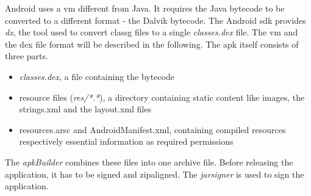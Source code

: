 Android uses a \gls{vm} different from Java.
It requires the Java bytecode to be converted to a different format - the Dalvik bytecode.
The Android \gls{sdk} provides \textit{dx}, the tool used to convert \gls{classg} files to a single \textit{classes.dex} file.
The \gls{vm} and the \gls{dex} file format will be described in the following.
\newline
The \gls{apk} itself consists of three parts.
\begin{itemize}
\item \textit{classes.dex}, a file containing the bytecode
\item resource files (\textit{res/*.*}), a directory containing static content like images, the strings.xml and the layout.xml files
\item resources.arsc and AndroidManifest.xml, containing compiled resources respectively essential information as required permissions
\end{itemize}
The \textit{apkBuilder} combines these files into one archive file.
\newline
Before releasing the application, it has to be signed and zipaligned.
The \textit{jarsigner} is used to sign the application.

